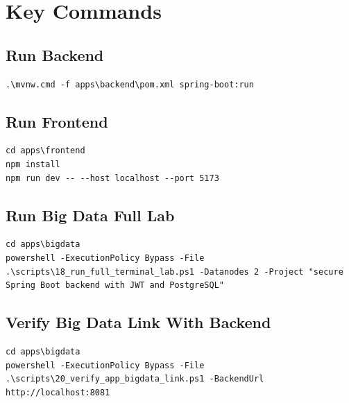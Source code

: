 \documentclass[12pt,a4paper]{report}
\begin{document}
\chapter{Key Commands}
\section{Run Backend}
\begin{lstlisting}
.\mvnw.cmd -f apps\backend\pom.xml spring-boot:run
\end{lstlisting}

\section{Run Frontend}
\begin{lstlisting}
cd apps\frontend
npm install
npm run dev -- --host localhost --port 5173
\end{lstlisting}

\section{Run Big Data Full Lab}
\begin{lstlisting}
cd apps\bigdata
powershell -ExecutionPolicy Bypass -File .\scripts\18_run_full_terminal_lab.ps1 -Datanodes 2 -Project "secure Spring Boot backend with JWT and PostgreSQL"
\end{lstlisting}

\section{Verify Big Data Link With Backend}
\begin{lstlisting}
cd apps\bigdata
powershell -ExecutionPolicy Bypass -File .\scripts\20_verify_app_bigdata_link.ps1 -BackendUrl http://localhost:8081
\end{lstlisting}
\end{document}
